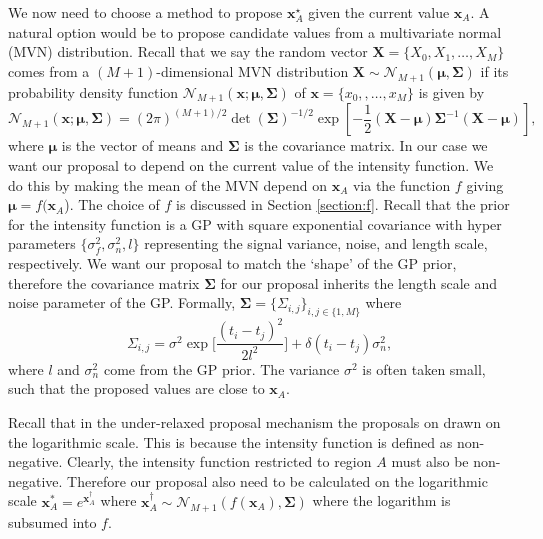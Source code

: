 \documentclass[oneside, 12 pt]{book}
\begin{document}
We now need to choose a method to propose $\mathbf{x}^\star_A$ given the current value $\mathbf{x}_A$. A natural option would be to propose candidate values from a multivariate normal (MVN) distribution. Recall that we say the random vector $\mathbf{X} = \{X_0,X_1, \dots, X_M\}$ comes from a $(M+1)$-dimensional MVN distribution $\mathbf{X} \sim \mathcal{N}_{M+1}(\boldsymbol\mu, \boldsymbol \Sigma)$ if its probability density function $\mathcal{N}_{M+1}(\mathbf{x} ; \boldsymbol \mu , \boldsymbol \Sigma)$ of $\mathbf{x} = \{x_0, ,\dots, x_M\}$ is given by
\begin{equation*}
	\mathcal{N}_{M+1}(\mathbf{x} ; \boldsymbol \mu , \boldsymbol \Sigma) = (2\pi)^{(M+1)/2} \det\left(\boldsymbol\Sigma \right)^{-1/2} \exp \left[ -\frac{1}{2} (\mathbf{X} - \boldsymbol\mu) \boldsymbol\Sigma ^{-1} (\mathbf{X} - \boldsymbol\mu) \right],
\end{equation*}
where $\boldsymbol{\mu}$ is the vector of means and $\boldsymbol{\Sigma}$ is the covariance matrix. In our case we want our proposal to depend on the current value of the intensity function. We do this by making the mean of the MVN depend on $\mathbf{x}_A$ via the function $f$ giving $\boldsymbol{\mu} = f(\mathbf{x}_A$). The choice of $f$ is discussed in Section \ref{section:f}. Recall that the prior for the intensity function is a GP with square exponential covariance with hyper parameters $\{\sigma_f^2, \sigma_n^2,l \}$ representing the signal variance, noise, and length scale, respectively. We want our proposal to match the `shape' of the GP prior, therefore the covariance matrix $\boldsymbol{\Sigma}$ for our proposal inherits the length scale and noise parameter of the GP. Formally, $\boldsymbol{\Sigma} = \{\Sigma_{i,j}\}_{i,j \in \{1,M\}}$ where 
\begin{equation*}
\Sigma_{i,j} = \sigma^2 \exp \bigg[ \frac{(t_i - t_j)^2}{2l^2} \bigg] + \delta (t_i - t_j) \sigma_n^2,
\end{equation*}
where $l$ and $\sigma_n^2$ come from the GP prior. The variance $\sigma^2$ is often taken small, such that the proposed values are close to $\mathbf{x}_A$.  

Recall that in the under-relaxed proposal mechanism the proposals on drawn on the logarithmic scale. This is because the intensity function is defined as non-negative. Clearly, the intensity function restricted to region $A$ must also be non-negative. Therefore our proposal also need to be calculated on the logarithmic scale $\mathbf{x}_A^* = e^{\mathbf{x}_A^\dag}$ where $\mathbf{x}_A^\dag \sim \mathcal{N}_{M+1}(f(\mathbf{x}_A) , \boldsymbol \Sigma)$ where the logarithm is subsumed into $f$. 
\end{document}
